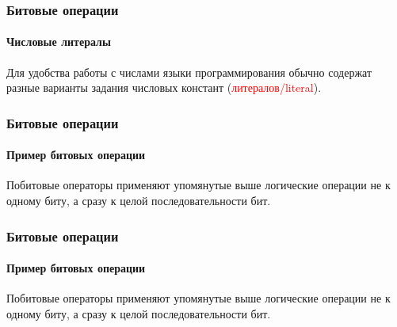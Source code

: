 \documentclass[aspectratio=169]{beamer}
\begin{document}
\begin{frame}
\frametitle{Битовые операции}
\framesubtitle{Числовые литералы}
\justifying
\small

Для удобства работы с числами языки программирования обычно содержат разные варианты задания числовых констант (\textcolor{red}{литералов/literal}).
\begin{figure}
    \captionsetup[subfigure]{labelformat=empty}
    \centering
\end{figure}
\end{frame}

\begin{frame}
\frametitle{Битовые операции}
\framesubtitle{Пример битовых операции}
\justifying
\small
Побитовые операторы применяют упомянутые выше логические операции не к одному биту, а сразу к целой последовательности бит.
\begin{figure}
    \captionsetup[subfigure]{labelformat=empty}
    \centering
\end{figure}
\end{frame}

\begin{frame}
\frametitle{Битовые операции}
\framesubtitle{Пример битовых операции}
\justifying
\small
Побитовые операторы применяют упомянутые выше логические операции не к одному биту, а сразу к целой последовательности бит.
\begin{figure}
    \captionsetup[subfigure]{labelformat=empty}
    \centering
\end{figure}
\end{frame}
\end{document}
